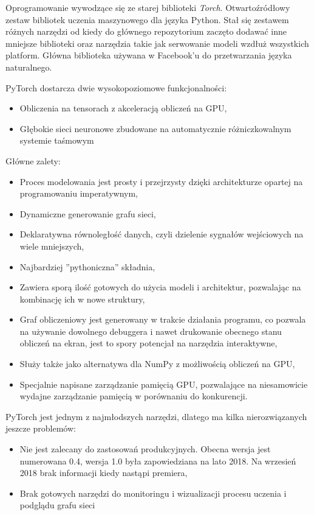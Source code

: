 \documentclass[12pt,a4paper,twoside,titlepage,openright]{book}
\begin{document}
Oprogramowanie wywodzące się ze starej biblioteki \textit{Torch}. Otwartoźródłowy zestaw bibliotek uczenia maszynowego dla języka Python. Stał się zestawem różnych narzędzi od kiedy do głównego repozytorium zaczęto dodawać inne mniejsze biblioteki oraz narzędzia takie jak serwowanie modeli wzdłuż wszystkich platform. Główna biblioteka używana w Facebook'u do przetwarzania języka naturalnego. 

PyTorch dostarcza dwie wysokopoziomowe funkcjonalności:
\begin{itemize}
\item Obliczenia na tensorach z akceleracją obliczeń na GPU,
\item Głębokie sieci neuronowe zbudowane na automatycznie różniczkowalnym systemie taśmowym
\end{itemize}

Główne zalety:
\begin{itemize}
\item Proces modelowania jest prosty i przejrzysty dzięki architekturze opartej na programowaniu imperatywnym,
\item Dynamiczne generowanie grafu sieci,
\item Deklaratywna równoległość danych, czyli dzielenie sygnałów wejściowych na wiele mniejszych,
\item Najbardziej ''pythoniczna'' składnia,
\item Zawiera sporą ilość gotowych do użycia modeli i architektur, pozwalając na kombinację ich w nowe struktury,
\item Graf obliczeniowy jest generowany w trakcie działania programu, co pozwala na używanie dowolnego debuggera i nawet drukowanie obecnego stanu obliczeń na ekran, jest to spory potencjał na narzędzia interaktywne,
\item Służy także jako alternatywa dla NumPy z możliwością obliczeń na GPU,
\item Specjalnie napisane zarządzanie pamięcią GPU, pozwalające na niesamowicie wydajne zarządzanie pamięcią w porównaniu do konkurencji.
\end{itemize}

PyTorch jest jednym z najmłodszych narzędzi, dlatego ma kilka nierozwiązanych jeszcze problemów:
\begin{itemize}
\item Nie jest zalecany do zastosowań produkcyjnych. Obecna wersja jest numerowana 0.4, wersja 1.0 była zapowiedziana na lato 2018. Na wrzesień 2018 brak informacji kiedy nastąpi premiera,
\item Brak gotowych narzędzi do monitoringu i wizualizacji procesu uczenia i podglądu grafu sieci
\end{itemize}\cite{book:2226069}
\end{document}
